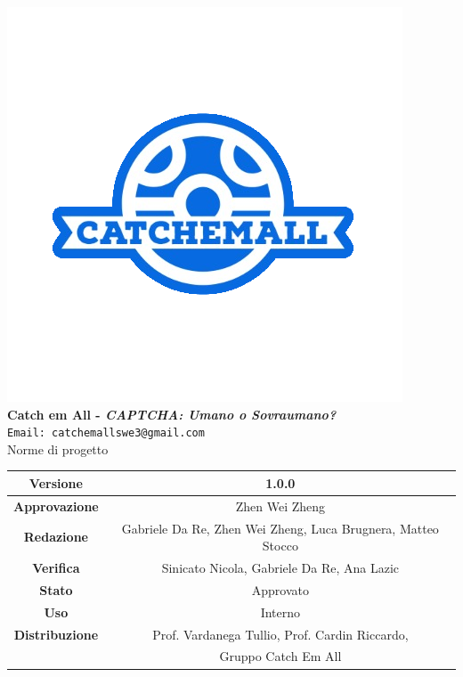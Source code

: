 \begin{titlepage}
\begin{center}
	\includegraphics[scale = 1.5]{img/logo.png}\\
	\bigskip
	\large \textbf{Catch em All - \textit{CAPTCHA: Umano o Sovraumano?}}\\
	\texttt{Email: catchemallswe3@gmail.com}\\
	\vfill
	{\fontsize{1.5cm}{0}\selectfont Norme di progetto}\\
	\vfill
	\setlength\extrarowheight{5pt}
	\begin{tabularx}{\textwidth}{| c | c |}
		\hline
		\textbf{Versione} & 1.0.0\\
		\hline
		\textbf{Approvazione} & Zhen Wei Zheng\\
		\hline
		\textbf{Redazione} & Gabriele Da Re, Zhen Wei Zheng, Luca Brugnera, Matteo Stocco\\
		\hline
		\textbf{Verifica} & Sinicato Nicola, Gabriele Da Re, Ana Lazic\\
		\hline
		\textbf{Stato} & Approvato\\
		\hline
		\textbf{Uso} & Interno\\
		\hline
		\textbf{Distribuzione} & Prof. Vardanega Tullio, Prof. Cardin Riccardo,\\
		 & Gruppo Catch Em All\\
		\hline
	\end{tabularx}
\end{center}
\end{titlepage}